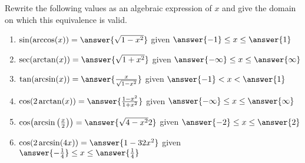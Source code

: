 \documentclass{ximera}
\author{Elizabeth Campolongo}
\begin{document}
\begin{exercise}
Rewrite the following values as an algebraic expression of $x$ and give the domain on which this equivalence is valid.%
\begin{enumerate}
\item $\sin(\arccos(x)) = \answer{\sqrt{1-x^2}}$ given $\answer{-1} \leq x \leq \answer{1}$
%
\item  $\sec(\arctan(x)) = \answer{\sqrt{1+x^2}}$ given $\answer{-\infty} \leq x \leq \answer{\infty}$
%
\item $\tan(\arcsin(x)) = \answer{\frac{x}{\sqrt{1-x^2}}}$ given $\answer{-1} < x < \answer{1}$
%
\item $\cos(2\arctan(x)) = \answer{\frac{1-x^2}{1+x^2}}$ given $\answer{-\infty} \leq x \leq \answer{\infty}$
%
\item $\cos\!\big(\!\arcsin\big(\frac{x}{2}\big)\big) = \answer{\sqrt{4-x^2}{2}}$ given $\answer{-2} \leq x \leq \answer{2}$
%
\item $\cos(2\arcsin(4x)) = \answer{1-32x^2}$ given $\answer{-\frac{1}{4}} \leq x \leq \answer{\frac{1}{4}}$
%
\end{enumerate}
\end{exercise}
\end{document}
